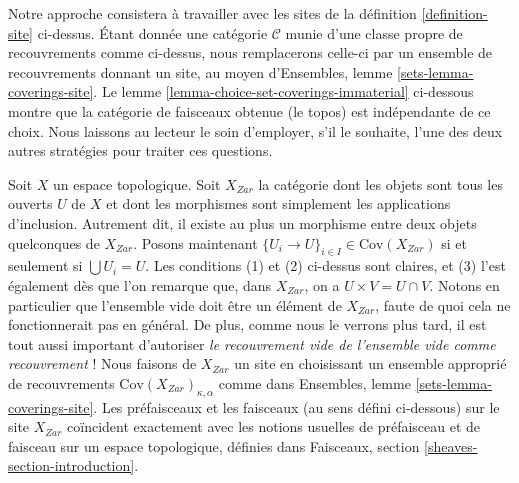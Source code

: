 \begin{remark}
\medskip\noindent
Notre approche consistera à travailler avec les sites de la
définition \ref{definition-site} ci-dessus. Étant donnée une catégorie
$\mathcal{C}$ munie d’une classe propre de recouvrements comme ci-dessus,
nous remplacerons celle-ci par un ensemble de recouvrements donnant un site,
au moyen d’Ensembles, lemme \ref{sets-lemma-coverings-site}. Le
lemme \ref{lemma-choice-set-coverings-immaterial} ci-dessous montre que la
catégorie de faisceaux obtenue (le topos) est indépendante de ce choix. Nous
laissons au lecteur le soin d’employer, s’il le souhaite, l’une des deux
autres stratégies pour traiter ces questions.
\end{remark}

\begin{example}
\label{example-site-topological}
Soit $X$ un espace topologique. Soit $X_{Zar}$ la catégorie dont les objets
sont tous les ouverts $U$ de $X$ et dont les morphismes sont simplement les
applications d’inclusion. Autrement dit, il existe au plus un morphisme entre
deux objets quelconques de $X_{Zar}$. Posons maintenant
$\{U_i \to U\}_{i \in I}\in \text{Cov}(X_{Zar})$ si et seulement si
$\bigcup U_i = U$. Les conditions (1) et (2) ci-dessus sont claires, et (3)
l’est également dès que l’on remarque que, dans $X_{Zar}$, on a
$U \times V = U \cap V$. Notons en particulier que l’ensemble vide doit être
un élément de $X_{Zar}$, faute de quoi cela ne fonctionnerait pas en général.
De plus, comme nous le verrons plus tard, il est tout aussi important
d’autoriser {\it le recouvrement vide de l’ensemble vide comme recouvrement} !
Nous faisons de $X_{Zar}$ un site en choisissant un ensemble approprié de
recouvrements $\text{Cov}(X_{Zar})_{\kappa, \alpha}$ comme dans Ensembles,
lemme \ref{sets-lemma-coverings-site}. Les préfaisceaux et les faisceaux
(au sens défini ci-dessous) sur le site $X_{Zar}$ coïncident exactement avec
les notions usuelles de préfaisceau et de faisceau sur un espace topologique,
définies dans Faisceaux, section \ref{sheaves-section-introduction}.
\end{example}

